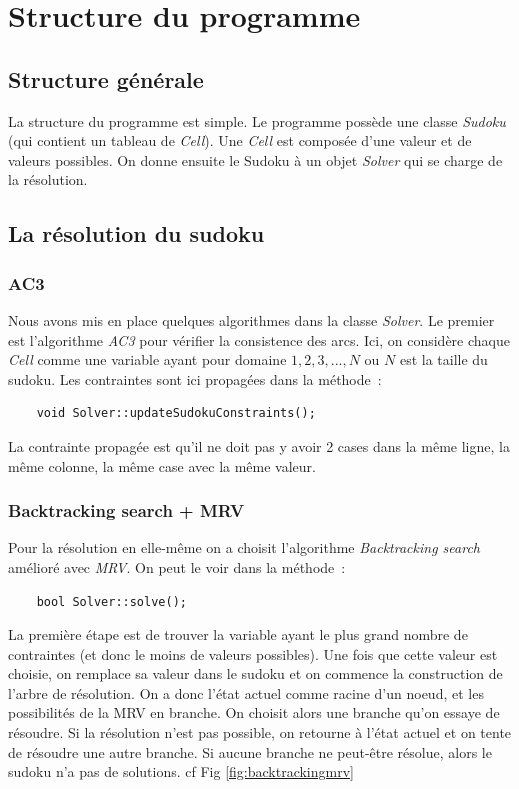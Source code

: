 \documentclass{article}
\begin{document}
\section{Structure du programme}
\subsection{Structure générale}

La structure du programme est simple. Le programme possède une classe \emph{Sudoku} (qui contient un tableau de \emph{Cell}). Une \emph{Cell} est composée d'une valeur et de valeurs possibles. On donne ensuite le Sudoku à un objet \emph{Solver} qui se charge de la résolution.

\subsection{La résolution du sudoku}

\subsubsection{AC3}

Nous avons mis en place quelques algorithmes dans la classe \emph{Solver}. Le premier est l'algorithme \emph{AC3} pour vérifier la consistence des arcs. Ici, on considère chaque \emph{Cell} comme une variable ayant pour domaine ${1,2,3,...,N}$ ou $N$ est la taille du sudoku. Les contraintes sont ici propagées dans la méthode~:

\begin{verbatim}
	void Solver::updateSudokuConstraints();
\end{verbatim}

La contrainte propagée est qu'il ne doit pas y avoir 2 cases dans la même ligne, la même colonne, la même case avec la même valeur.

\subsubsection{Backtracking search + MRV}

Pour la résolution en elle-même on a choisit l'algorithme \emph{Backtracking search} amélioré avec \emph{MRV}. On peut le voir dans la méthode~:
\begin{verbatim}
	bool Solver::solve();
\end{verbatim}

La première étape est de trouver la variable ayant le plus grand nombre de contraintes (et donc le moins de valeurs possibles). Une fois que cette valeur est choisie, on remplace sa valeur dans le sudoku et on commence la construction de l'arbre de résolution. On a donc l'état actuel comme racine d'un noeud, et les possibilités de la MRV en branche. On choisit alors une branche qu'on essaye de résoudre. Si la résolution n'est pas possible, on retourne à l'état actuel et on tente de résoudre une autre branche. Si aucune branche ne peut-être résolue, alors le sudoku n'a pas de solutions. cf Fig \ref{fig:backtrackingmrv}
\end{document}
